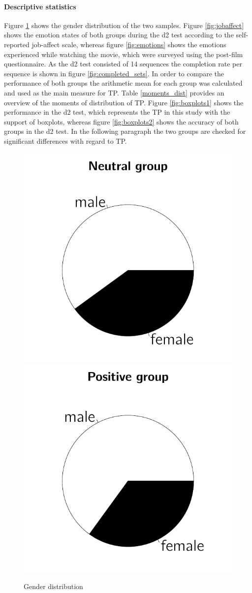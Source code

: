 \documentclass[	
	12pt, %
	a4paper, %
  abstracton
]{scrartcl}\usepackage[]{graphicx}\usepackage[]{color}
\newenvironment{knitrout}{}{} %
\begin{document}
\paragraph{Descriptive statistics}
Figure \ref{fig:gender} shows the gender distribution of the two samples. Figure \ref{fig:jobaffect} shows the emotion states of both groups during the d2 test according to the self-reported job-affect scale, whereas figure \ref{fig:emotions} shows the emotions experienced while watching the movie, which were surveyed using the post-film questionnaire. As the d2 test consisted of 14 sequences the completion rate per sequence is shown in figure \ref{fig:completed_sets}. In order to compare the performance of both groups the arithmetic mean for each group was calculated and used as the main measure for TP. Table \ref{moments_dist} provides an overview of the moments of distribution of TP. Figure \ref{fig:boxplots1} shows the performance in the d2 test, which represents the TP in this study with the support of boxplots, whereas figure \ref{fig:boxplots2} shows the accuracy of both groups in the d2 test. In the following paragraph the two groups are checked for significant differences with regard to TP.


\begin{knitrout}\footnotesize
{}\color{fgcolor}\begin{figure}[]


{\centering \includegraphics[width=.3\linewidth]{figure/beamer-gender1} 
\includegraphics[width=.3\linewidth]{figure/beamer-gender2} 

}

\caption[Gender distribution]{Gender distribution\label{fig:gender}}
\end{figure}


\end{knitrout}
\end{document}
